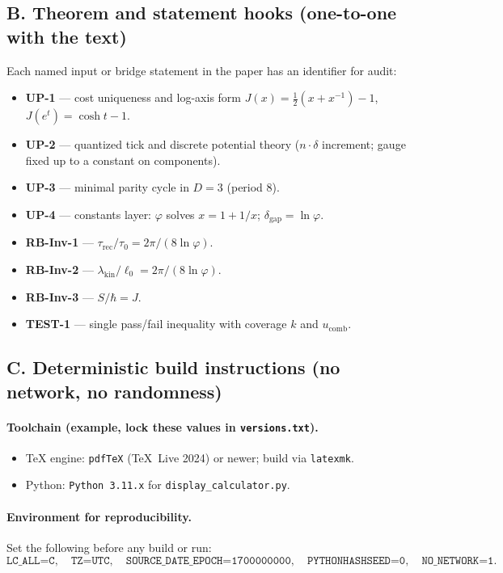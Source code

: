 \documentclass[11pt]{article}
\theoremstyle{plain}
\theoremstyle{definition}
\theoremstyle{remark}
\begin{document}
\subsection*{B. Theorem and statement hooks (one-to-one with the text)}
Each named input or bridge statement in the paper has an identifier for audit:
\begin{itemize}
  \item \textbf{UP-1} — cost uniqueness and log-axis form \(J(x)=\tfrac12(x+x^{-1})-1\), \(J(e^{t})=\cosh t-1\).
  \item \textbf{UP-2} — quantized tick and discrete potential theory (\(n\cdot\delta\) increment; gauge fixed up to a constant on components).
  \item \textbf{UP-3} — minimal parity cycle in \(D=3\) (period \(8\)).
  \item \textbf{UP-4} — constants layer: \(\varphi\) solves \(x=1+1/x\); \(\delta_{\mathrm{gap}}=\ln\varphi\).
  \item \textbf{RB-Inv-1} — \(\tau_{\mathrm{rec}}/\tau_{0}=2\pi/(8\ln\varphi)\).
  \item \textbf{RB-Inv-2} — \(\lambda_{\mathrm{kin}}/\ell_{0}=2\pi/(8\ln\varphi)\).
  \item \textbf{RB-Inv-3} — \(S/\hbar=J\).
  \item \textbf{TEST-1} — single pass/fail inequality with coverage \(k\) and \(u_{\mathrm{comb}}\).
\end{itemize}

\subsection*{C. Deterministic build instructions (no network, no randomness)}
\paragraph{Toolchain (example, lock these values in \texttt{versions.txt}).}
\begin{itemize}
  \item TeX engine: \texttt{pdfTeX} (TeX~Live 2024) or newer; build via \texttt{latexmk}.
  \item Python: \texttt{Python 3.11.x} for \texttt{display\_calculator.py}.
\end{itemize}

\paragraph{Environment for reproducibility.}
Set the following before any build or run:
\[
\texttt{LC\_ALL=C},\quad
\texttt{TZ=UTC},\quad
\texttt{SOURCE\_DATE\_EPOCH=1700000000},\quad
\texttt{PYTHONHASHSEED=0},\quad
\texttt{NO\_NETWORK=1}.
\]
\end{document}
